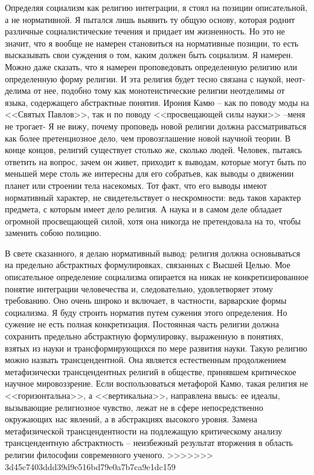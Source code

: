 \documentclass{book}
\begin{document}
Определяя социализм как религию интеграции, я стоял на позиции описательной, а не нормативной. Я пытался лишь выя­вить ту общую основу, которая роднит различные социалисти­ческие течения и придает им жизненность. Но это не значит, что я вообще не намерен становиться на нормативные позиции, то есть высказывать свои суждения о том, каким должен быть социализм. Я намерен. Можно даже сказать, что я намерен проповедовать определенную религию или определенную фор­му религии. И эта религия будет тесно связана с наукой, неот­делима от нее, подобно тому как монотеистические религии неотделимы от языка, содержащего абстрактные понятия. Ирония Камю -- как по поводу моды на <<Святых Павлов>>, так и по поводу <<просвещающей силы науки>> --меня не тро­гает- Я не вижу, почему проповедь новой религии должна рас­сматриваться как более претенциозное дело, чем провозглаше­ние новой научной теории. В конце концов, религий существу­ет столько же, сколько людей. Человек, пытаясь ответить на вопрос, зачем он живет, приходит к 
выводам, которые могут быть по меньшей мере столь же интересны для его собратьев, как выводы о движении планет или строении тела насекомых. Тот факт, что его выводы имеют нормативный характер, не сви­детельствует о нескромности: ведь таков характер предмета, с которым имеет дело религия. А наука и в самом деле обла­дает огромной просвещающей силой, хотя она никогда не пре­тендовала на то, чтобы заменить собою полицию.

В свете сказанного, я делаю нормативный вывод: религия должна основываться на предельно абстрактных формулиров­ках, связанных с Высшей Целью. Мое описательное определе­ние социализма опирается на никак не конкретизированное понятие интеграции человечества и, следовательно, удовлетво­ряет этому требованию. Оно очень широко и включает, в частности, варварские формы социализма. Я буду строить норматив путем сужения этого определения. Но сужение не есть полная конкретизация. Постоянная часть религии должна сохранить предельно абстрактную формулировку, выраженную в понятиях, взятых из науки и трансформирующихся по мере развития науки. Такую религию можно назвать трансцендентной. Она является естественным продолжением метафизически трансцендентных религий в обществе, принявшем критическое научное мировоззрение. Если воспользоваться метафорой Камю, такая религия не <<горизонтальна>>, а <<вертикальна>>, направле­на ввысь: ее идеалы, вызывающие религиозное чувство, лежат не в сфере непосредственно окружающих нас явлений, 
а в абстракциях высокого уровня. Замена метафизической транс­цендентности на подлежащую критическому анализу трансцендентную абстрактность -- неизбежный результат вторжения в область религии философии современного ученого.
>>>>>>> 3d45c7403ddd39d9e516bd79e0a7b7ca9e1dc159
\end{document}
